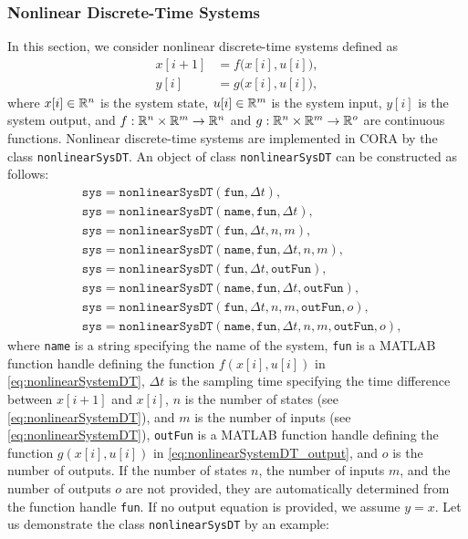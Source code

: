 \subsubsection{Nonlinear Discrete-Time Systems} \label{sec:nonlinearSystemsDT}

In this section, we consider nonlinear discrete-time systems defined as
\begin{align}
	x[i+1] &= f \big( x[i],u[i] \big), \label{eq:nonlinearSystemDT} \\
	y[i] &= g \big( x[i],u[i] \big), \label{eq:nonlinearSystemDT_output}
\end{align}
where $x[i] \in \mathbb{R}^n$ is the system state, $u[i] \in \mathbb{R}^m$ is the system input, $y[i]$ is the system output, and $f:\mathbb{R}^n \times \mathbb{R}^m \to \mathbb{R}^n$ and $g:\mathbb{R}^n \times \mathbb{R}^m \to \mathbb{R}^o$ are continuous functions. %
Nonlinear discrete-time systems are implemented in CORA by the class \texttt{nonlinearSysDT}. An object of class \texttt{nonlinearSysDT} can be constructed as follows:
\begin{equation*}
	\begin{split}
		& \texttt{sys} = \texttt{nonlinearSysDT}(\texttt{fun},\Delta t), \\
     	& \texttt{sys} = \texttt{nonlinearSysDT}(\texttt{name},\texttt{fun},\Delta t), \\
    	& \texttt{sys} = \texttt{nonlinearSysDT}(\texttt{fun},\Delta t,n,m), \\
     	& \texttt{sys} = \texttt{nonlinearSysDT}(\texttt{name},\texttt{fun},\Delta t,n,m), \\
     	& \texttt{sys} = \texttt{nonlinearSysDT}(\texttt{fun},\Delta t,\texttt{outFun}), \\
     	& \texttt{sys} = \texttt{nonlinearSysDT}(\texttt{name},\texttt{fun},\Delta t,\texttt{outFun}), \\
     	& \texttt{sys} = \texttt{nonlinearSysDT}(\texttt{fun},\Delta t,n,m,\texttt{outFun},o), \\
     	& \texttt{sys} = \texttt{nonlinearSysDT}(\texttt{name},\texttt{fun},\Delta t,n,m,\texttt{outFun},o),
	\end{split}
\end{equation*} 
where \texttt{name} is a string specifying the name of the system, \texttt{fun} is a MATLAB function handle defining the function $f(x[i],u[i])$ in \eqref{eq:nonlinearSystemDT}, $\Delta t$ is the sampling time specifying the time difference between $x[i+1]$ and $x[i]$, $n$ is the number of states (see \eqref{eq:nonlinearSystemDT}), and $m$ is the number of inputs (see \eqref{eq:nonlinearSystemDT}), \texttt{outFun} is a MATLAB function handle defining the function $g(x[i],u[i])$ in \eqref{eq:nonlinearSystemDT_output}, and $o$ is the number of outputs. If the number of states $n$, the number of inputs $m$, and the number of outputs $o$ are not provided, they are automatically determined from the function handle \texttt{fun}. If no output equation is provided, we assume $y = x$. Let us demonstrate the class \texttt{nonlinearSysDT} by an example:

